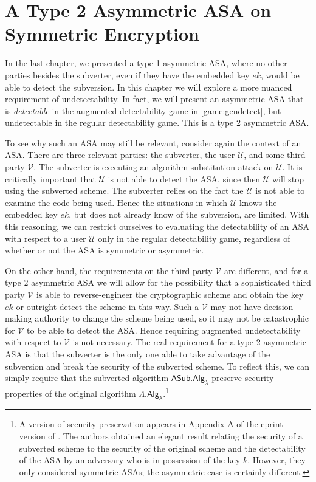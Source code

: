 \chapter{A Type 2 Asymmetric ASA on Symmetric Encryption} \label{sec:asymASA2}

In the last chapter, we presented a type 1 asymmetric ASA, where no other parties besides the subverter, even if they have the embedded key $ek$, would be able to detect the subversion. In this chapter we will explore a more nuanced requirement of undetectability. In fact, we will present an asymmetric ASA that is \emph{detectable} in the augmented detectability game in \autoref{game:gendetect}, but undetectable in the regular detectability game. This is a type 2 asymmetric ASA.

To see why such an ASA may still be relevant, consider again the context of an ASA. There are three relevant parties: the subverter, the user $\mathcal{U}$, and some third party $\mathcal{V}$. The subverter is executing an algorithm substitution attack on $\mathcal{U}$. It is critically important that $\mathcal{U}$ is not able to detect the ASA, since then $\mathcal{U}$ will stop using the subverted scheme. The subverter relies on the fact the $\mathcal{U}$ is not able to examine the code being used. Hence the situations in which $\mathcal{U}$ knows the embedded key $ek$, but does not already know of the subversion, are limited. With this reasoning, we can restrict ourselves to evaluating the detectability of an ASA with respect to a user $\mathcal{U}$ only in the regular detectability game, regardless of whether or not the ASA is symmetric or asymmetric.

On the other hand, the requirements on the third party $\mathcal{V}$ are different, and for a type 2 asymmetric ASA we will allow for the possibility that a sophisticated third party $\mathcal{V}$ is able to reverse-engineer the cryptographic scheme and obtain the key $ek$ or outright detect the scheme in this way. Such a $\mathcal{V}$ may not have decision-making authority to change the scheme being used, so it may not be catastrophic for $\mathcal{V}$ to be able to detect the ASA. Hence requiring augmented undetectability with respect to $\mathcal{V}$ is not necessary. The real requirement for a type 2 asymmetric ASA is that the subverter is the only one able to take advantage of the subversion and break the security of the subverted scheme. To reflect this, we can simply require that the subverted algorithm $\mathsf{ASub.Alg_\lambda}$ preserve security properties of the original algorithm $\mathsf{\Lambda.Alg_\lambda}$.\footnote{A version of security preservation appears in Appendix A of the eprint version of \cite{FSE:DegFarPoe15}. The authors obtained an elegant result relating the security of a subverted scheme to the security of the original scheme and the detectability of the ASA by an adversary who is in possession of the key $\overline{k}$. However, they only considered symmetric ASAs; the asymmetric case is certainly different.}

